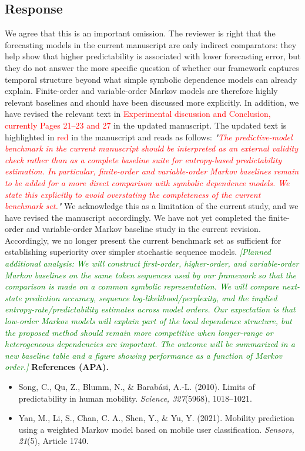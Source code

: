 \documentclass{NSF}
\begin{document}
\subsection{Response}
We agree that this is an important omission. The reviewer is right that the forecasting models in the current manuscript are only indirect comparators: they help show that higher predictability is associated with lower forecasting error, but they do not answer the more specific question of whether our framework captures temporal structure beyond what simple symbolic dependence models can already explain. Finite-order and variable-order Markov models are therefore highly relevant baselines and should have been discussed more explicitly.
\noindent In addition, we have revised the relevant text in \textcolor{red}{Experimental discussion and Conclusion, currently Pages 21--23 and 27} in the updated manuscript. The updated text is highlighted in \textcolor{red}{red} in the manuscript and reads as follows:
\vskip 0.1cm
\noindent \textit{"\textcolor{red}{The predictive-model benchmark in the current manuscript should be interpreted as an external validity check rather than as a complete baseline suite for entropy-based predictability estimation. In particular, finite-order and variable-order Markov baselines remain to be added for a more direct comparison with symbolic dependence models. We state this explicitly to avoid overstating the completeness of the current benchmark set.}"}
\vskip 0.05in
\noindent We acknowledge this as a limitation of the current study, and we have revised the manuscript accordingly. We have not yet completed the finite-order and variable-order Markov baseline study in the current revision. Accordingly, we no longer present the current benchmark set as sufficient for establishing superiority over simpler stochastic sequence models.
\vskip 0.05in
\noindent\textcolor{green}{\textit{[Planned additional analysis: We will construct first-order, higher-order, and variable-order Markov baselines on the same token sequences used by our framework so that the comparison is made on a common symbolic representation. We will compare next-state prediction accuracy, sequence log-likelihood/perplexity, and the implied entropy-rate/predictability estimates across model orders. Our expectation is that low-order Markov models will explain part of the local dependence structure, but the proposed method should remain more competitive when longer-range or heterogeneous dependencies are important. The outcome will be summarized in a new baseline table and a figure showing performance as a function of Markov order.]}}
\vskip 0.05in
\noindent\textbf{References (APA).}
\begin{itemize}
    \item Song, C., Qu, Z., Blumm, N., \& Barab\'asi, A.-L. (2010). Limits of predictability in human mobility. \textit{Science, 327}(5968), 1018--1021.
    \item Yan, M., Li, S., Chan, C. A., Shen, Y., \& Yu, Y. (2021). Mobility prediction using a weighted Markov model based on mobile user classification. \textit{Sensors, 21}(5), Article 1740.
\end{itemize}
\end{document}
